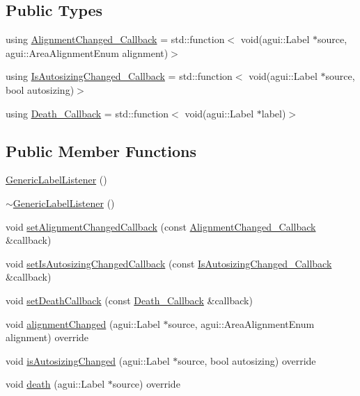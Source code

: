 \subsection*{Public Types}
\begin{DoxyCompactItemize}
\item 
using \mbox{\hyperlink{classec_1_1_generic_label_listener_af470c076b7748036de36bc1d99bce445}{Alignment\+Changed\+\_\+\+Callback}} = std\+::function$<$ void(agui\+::\+Label $\ast$source, agui\+::\+Area\+Alignment\+Enum alignment)$>$
\item 
using \mbox{\hyperlink{classec_1_1_generic_label_listener_adf4cec1bd13682ce66c52f0484fe46c6}{Is\+Autosizing\+Changed\+\_\+\+Callback}} = std\+::function$<$ void(agui\+::\+Label $\ast$source, bool autosizing)$>$
\item 
using \mbox{\hyperlink{classec_1_1_generic_label_listener_af79a68f4cb5c696fa1d921e7441d93eb}{Death\+\_\+\+Callback}} = std\+::function$<$ void(agui\+::\+Label $\ast$label)$>$
\end{DoxyCompactItemize}
\subsection*{Public Member Functions}
\begin{DoxyCompactItemize}
\item 
\mbox{\hyperlink{classec_1_1_generic_label_listener_a743def8b1800f2bc7d14c3ef05e4fa45}{Generic\+Label\+Listener}} ()
\item 
\mbox{\hyperlink{classec_1_1_generic_label_listener_aaf153b11abad595d7f523d091dec3903}{$\sim$\+Generic\+Label\+Listener}} ()
\item 
void \mbox{\hyperlink{classec_1_1_generic_label_listener_a02e2fc85023744de2891a53058bb229b}{set\+Alignment\+Changed\+Callback}} (const \mbox{\hyperlink{classec_1_1_generic_label_listener_af470c076b7748036de36bc1d99bce445}{Alignment\+Changed\+\_\+\+Callback}} \&callback)
\item 
void \mbox{\hyperlink{classec_1_1_generic_label_listener_a3141f73b5396a6a57b81159619ada6db}{set\+Is\+Autosizing\+Changed\+Callback}} (const \mbox{\hyperlink{classec_1_1_generic_label_listener_adf4cec1bd13682ce66c52f0484fe46c6}{Is\+Autosizing\+Changed\+\_\+\+Callback}} \&callback)
\item 
void \mbox{\hyperlink{classec_1_1_generic_label_listener_abf6b7abe8b5aab4c772d6e4b1cd0baaf}{set\+Death\+Callback}} (const \mbox{\hyperlink{classec_1_1_generic_label_listener_af79a68f4cb5c696fa1d921e7441d93eb}{Death\+\_\+\+Callback}} \&callback)
\item 
void \mbox{\hyperlink{classec_1_1_generic_label_listener_a9e62304bb430f496769ba096dc33e21c}{alignment\+Changed}} (agui\+::\+Label $\ast$source, agui\+::\+Area\+Alignment\+Enum alignment) override
\item 
void \mbox{\hyperlink{classec_1_1_generic_label_listener_aec79c600f300b002190155d67794e3c6}{is\+Autosizing\+Changed}} (agui\+::\+Label $\ast$source, bool autosizing) override
\item 
void \mbox{\hyperlink{classec_1_1_generic_label_listener_a941183da9f6cef4a2ab6ced1814a2d84}{death}} (agui\+::\+Label $\ast$source) override
\end{DoxyCompactItemize}


